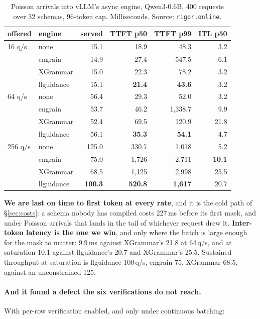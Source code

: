 \documentclass{article}
\begin{document}
\begin{table}[t]
\caption{Poisson arrivals into vLLM's async engine, Qwen3-0.6B, 400 requests
over 32 schemas, 96-token cap. Milliseconds. Source: \texttt{rigor.online}.}
\label{tab:online}
\vskip 0.1in
\begin{center}
\begin{small}
\begin{tabular}{llrrrr}
\toprule
offered & engine & served & TTFT p50 & TTFT p99 & ITL p50 \\
\midrule
16 q/s & none & 15.1 & 18.9 & 48.3 & 3.2 \\
 & engrain & 14.9 & 27.4 & 547.5 & 6.1 \\
 & XGrammar & 15.0 & 22.3 & 78.2 & 3.2 \\
 & llguidance & 15.1 & \textbf{21.4} & \textbf{43.6} & 3.2 \\
\midrule
64 q/s & none & 56.4 & 29.3 & 52.0 & 3.2 \\
 & engrain & 53.7 & 46.2 & 1{,}338.7 & 9.9 \\
 & XGrammar & 52.4 & 69.5 & 120.9 & 21.8 \\
 & llguidance & 56.1 & \textbf{35.3} & \textbf{54.1} & 4.7 \\
\midrule
256 q/s & none & 125.0 & 330.7 & 1{,}018 & 5.2 \\
 & engrain & 75.0 & 1{,}726 & 2{,}711 & \textbf{10.1} \\
 & XGrammar & 68.5 & 1{,}125 & 2{,}998 & 25.5 \\
 & llguidance & \textbf{100.3} & \textbf{520.8} & \textbf{1{,}617} & 20.7 \\
\bottomrule
\end{tabular}
\end{small}
\end{center}
\vskip -0.1in
\end{table}

\textbf{We are last on time to first token at every rate}, and it is the cold
path of \S\ref{sec:costs}: a schema nobody has compiled costs 227\,ms before
its first mask, and under Poisson arrivals that lands in the tail of whichever
request drew it. \textbf{Inter-token latency is the one we win}, and only where
the batch is large enough for the mask to matter: 9.9\,ms against XGrammar's
21.8 at 64\,q/s, and at saturation 10.1 against llguidance's 20.7 and
XGrammar's 25.5. Sustained throughput at saturation is llguidance 100\,q/s,
engrain 75, XGrammar 68.5, against an unconstrained 125.

\paragraph{And it found a defect the six verifications do not reach.} With
per-row verification enabled, and only under continuous batching:
\end{document}
